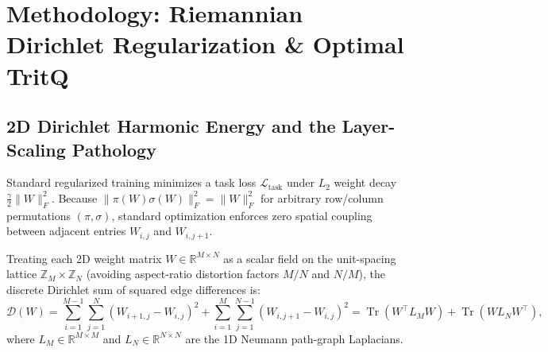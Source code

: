 \documentclass[11pt,a4paper]{article}
\begin{document}
\section{Methodology: Riemannian Dirichlet Regularization \& Optimal TritQ}
\label{sec:method}

\subsection{2D Dirichlet Harmonic Energy and the Layer-Scaling Pathology}
Standard regularized training minimizes a task loss $\mathcal{L}_{\text{task}}$ under $L_2$ weight decay $\frac{\gamma}{2}\|W\|_F^2$. Because $\| \pi(W)\sigma(W)\|_F^2 = \|W\|_F^2$ for arbitrary row/column permutations $(\pi, \sigma)$, standard optimization enforces zero spatial coupling between adjacent entries $W_{i,j}$ and $W_{i,j+1}$.

Treating each 2D weight matrix $W \in \mathbb{R}^{M \times N}$ as a scalar field on the unit-spacing lattice $\mathbb{Z}_M \times \mathbb{Z}_N$ (avoiding aspect-ratio distortion factors $M/N$ and $N/M$), the discrete Dirichlet sum of squared edge differences is:
\begin{equation}
    \mathcal{D}(W) = \sum_{i=1}^{M-1} \sum_{j=1}^N (W_{i+1, j} - W_{i, j})^2 + \sum_{i=1}^M \sum_{j=1}^{N-1} (W_{i, j+1} - W_{i, j})^2
    = \operatorname{Tr}(W^\top L_M W) + \operatorname{Tr}(W L_N W^\top),
    \label{eq:dirichlet_discrete}
\end{equation}
where $L_M \in \mathbb{R}^{M \times M}$ and $L_N \in \mathbb{R}^{N \times N}$ are the 1D Neumann path-graph Laplacians.
\end{document}
